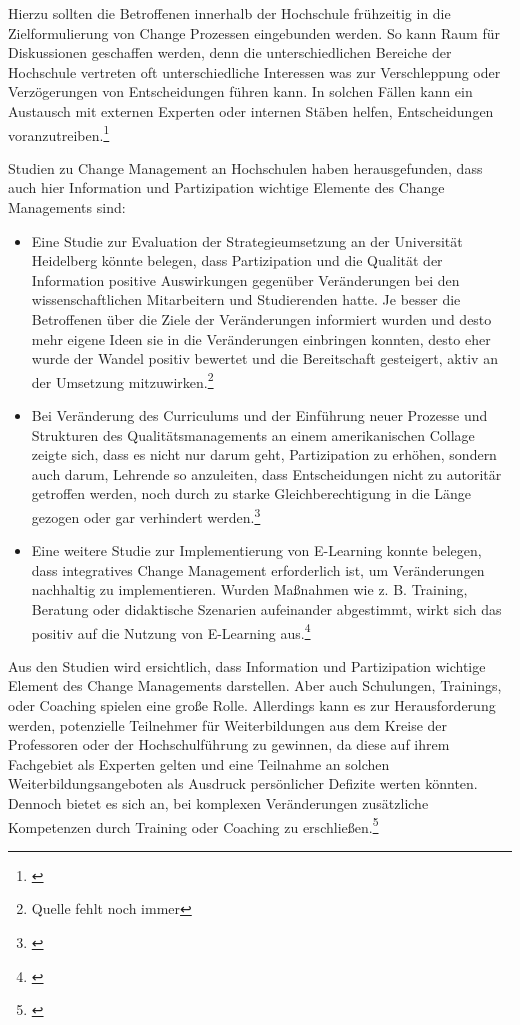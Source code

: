 Hierzu sollten die Betroffenen innerhalb der Hochschule frühzeitig in die Zielformulierung von Change Prozessen eingebunden werden. So kann Raum für Diskussionen geschaffen werden, denn die unterschiedlichen Bereiche der Hochschule vertreten oft unterschiedliche Interessen was zur Verschleppung oder Verzögerungen von Entscheidungen führen kann. In solchen Fällen kann ein Austausch mit externen Experten oder internen Stäben helfen, Entscheidungen voranzutreiben.\footnote{\cite{fisch_veraenderungen_2008}}

Studien zu Change Management an Hochschulen haben herausgefunden, dass auch hier Information und Partizipation wichtige Elemente des Change Managements sind:
\begin{itemize}
	\item Eine Studie zur Evaluation der Strategieumsetzung an der Universität Heidelberg könnte belegen, dass Partizipation und die Qualität der Information positive Auswirkungen gegenüber Veränderungen bei den wissenschaftlichen Mitarbeitern und Studierenden hatte. Je besser die Betroffenen über die Ziele der Veränderungen informiert wurden und desto mehr eigene Ideen sie in die Veränderungen einbringen konnten, desto eher wurde der Wandel positiv bewertet und die Bereitschaft gesteigert, aktiv an der Umsetzung mitzuwirken.\footnote{Quelle fehlt noch immer}
	
	\item Bei Veränderung des Curriculums und der Einführung neuer Prozesse und Strukturen des Qualitätsmanagements an einem amerikanischen Collage zeigte sich, dass es nicht nur darum geht, Partizipation zu erhöhen, sondern auch darum, Lehrende so anzuleiten, dass Entscheidungen nicht zu autoritär getroffen werden, noch durch zu starke Gleichberechtigung in die Länge gezogen oder gar verhindert werden.\footnote{\cite{cohen_major_2005}}
	
	\item Eine weitere Studie zur Implementierung von E-Learning konnte belegen, dass integratives Change Management erforderlich ist, um Veränderungen nachhaltig zu implementieren. Wurden Maßnahmen wie z. B. Training, Beratung oder didaktische Szenarien aufeinander abgestimmt, wirkt sich das positiv auf die Nutzung von E-Learning aus.\footnote{\cite{fuchs_change_2007}} 
\end{itemize}

Aus den Studien wird ersichtlich, dass Information und Partizipation wichtige Element des Change Managements darstellen. Aber auch Schulungen, Trainings, oder Coaching spielen eine große Rolle. Allerdings kann es zur Herausforderung werden, potenzielle Teilnehmer für Weiterbildungen aus dem Kreise der Professoren oder der Hochschulführung zu gewinnen, da diese auf ihrem Fachgebiet als Experten gelten und eine Teilnahme an solchen Weiterbildungsangeboten als Ausdruck persönlicher Defizite werten könnten. Dennoch bietet es sich an, bei komplexen Veränderungen zusätzliche Kompetenzen durch Training oder Coaching zu erschließen.\footnote{\cite{fisch_veraenderungen_2008}}

